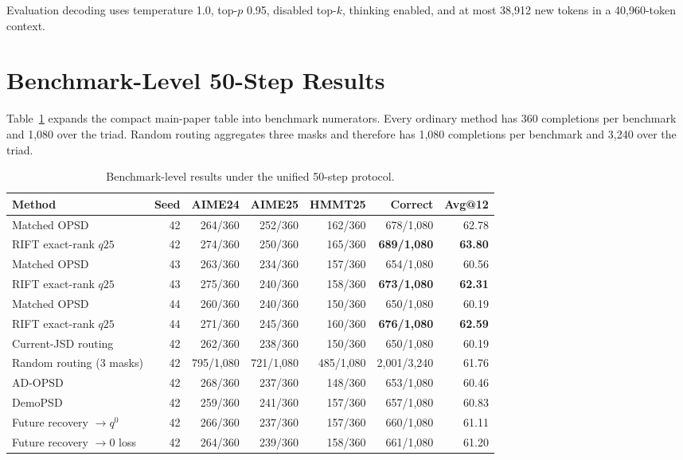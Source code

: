 \documentclass[10pt,letterpaper]{article}
\newcommand{\RIFT}{\textsc{RIFT}}
\newcommand{\best}[1]{\textbf{#1}}
\begin{document}
Evaluation decoding uses temperature 1.0, top-$p$ 0.95, disabled top-$k$,
thinking enabled, and at most 38,912 new tokens in a 40,960-token context.

\section{Benchmark-Level 50-Step Results}

Table~\ref{tab:supp-main} expands the compact main-paper table into benchmark
numerators. Every ordinary method has 360 completions per benchmark and 1,080
over the triad. Random routing aggregates three masks and therefore has 1,080
completions per benchmark and 3,240 over the triad.

\begin{table}[H]
\centering
\small
\setlength{\tabcolsep}{4pt}
\begin{tabular}{lrrrrrr}
\toprule
Method & Seed & AIME24 & AIME25 & HMMT25 & Correct & Avg@12 \\
\midrule
Matched OPSD & 42 & 264/360 & 252/360 & 162/360 & 678/1,080 & 62.78 \\
\RIFT{} exact-rank $q25$ & 42 & 274/360 & 250/360 & 165/360 & \best{689/1,080} & \best{63.80} \\
Matched OPSD & 43 & 263/360 & 234/360 & 157/360 & 654/1,080 & 60.56 \\
\RIFT{} exact-rank $q25$ & 43 & 275/360 & 240/360 & 158/360 & \best{673/1,080} & \best{62.31} \\
Matched OPSD & 44 & 260/360 & 240/360 & 150/360 & 650/1,080 & 60.19 \\
\RIFT{} exact-rank $q25$ & 44 & 271/360 & 245/360 & 160/360 & \best{676/1,080} & \best{62.59} \\
\midrule
Current-JSD routing & 42 & 262/360 & 238/360 & 150/360 & 650/1,080 & 60.19 \\
Random routing (3 masks) & 42 & 795/1,080 & 721/1,080 & 485/1,080 & 2,001/3,240 & 61.76 \\
AD-OPSD & 42 & 268/360 & 237/360 & 148/360 & 653/1,080 & 60.46 \\
DemoPSD & 42 & 259/360 & 241/360 & 157/360 & 657/1,080 & 60.83 \\
Future recovery $\to q^0$ & 42 & 266/360 & 237/360 & 157/360 & 660/1,080 & 61.11 \\
Future recovery $\to 0$ loss & 42 & 264/360 & 239/360 & 158/360 & 661/1,080 & 61.20 \\
\bottomrule
\end{tabular}
\caption{Benchmark-level results under the unified 50-step protocol.}
\label{tab:supp-main}
\end{table}
\end{document}
